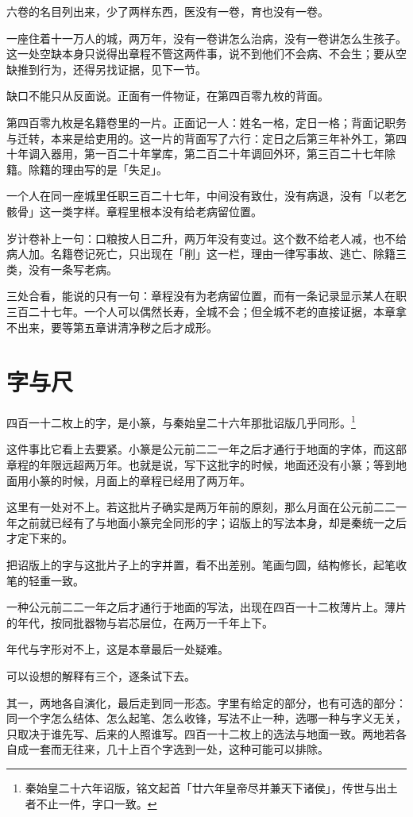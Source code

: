 六卷的名目列出来，少了两样东西，医没有一卷，育也没有一卷。

一座住着十一万人的城，两万年，没有一卷讲怎么治病，没有一卷讲怎么生孩子。这一处空缺本身只说得出章程不管这两件事，说不到他们不会病、不会生；要从空缺推到行为，还得另找证据，见下一节。

缺口不能只从反面说。正面有一件物证，在第四百零九枚的背面。

第四百零九枚是名籍卷里的一片。正面记一人：姓名一格，定日一格；背面记职务与迁转，本来是给吏用的。这一片的背面写了六行：定日之后第三年补外工，第四十年调入器用，第一百二十年掌库，第二百二十年调回外环，第三百二十七年除籍。除籍的理由写的是「失足」。

一个人在同一座城里任职三百二十七年，中间没有致仕，没有病退，没有「以老乞骸骨」这一类字样。章程里根本没有给老病留位置。

岁计卷补上一句：口粮按人日二升，两万年没有变过。这个数不给老人减，也不给病人加。名籍卷记死亡，只出现在「削」这一栏，理由一律写事故、逃亡、除籍三类，没有一条写老病。

三处合看，能说的只有一句：章程没有为老病留位置，而有一条记录显示某人在职三百二十七年。一个人可以偶然长寿，全城不会；但全城不老的直接证据，本章拿不出来，要等第五章讲清净秽之后才成形。

\section{字与尺}

四百一十二枚上的字，是小篆，与秦始皇二十六年那批诏版几乎同形。\footnote{秦始皇二十六年诏版，铭文起首「廿六年皇帝尽并兼天下诸侯」，传世与出土者不止一件，字口一致。}

这件事比它看上去要紧。小篆是公元前二二一年之后才通行于地面的字体，而这部章程的年限远超两万年。也就是说，写下这批字的时候，地面还没有小篆；等到地面用小篆的时候，月面上的章程已经用了两万年。

这里有一处对不上。若这批片子确实是两万年前的原刻，那么月面在公元前二二一年之前就已经有了与地面小篆完全同形的字；诏版上的写法本身，却是秦统一之后才定下来的。

把诏版上的字与这批片子上的字并置，看不出差别。笔画匀圆，结构修长，起笔收笔的轻重一致。

一种公元前二二一年之后才通行于地面的写法，出现在四百一十二枚薄片上。薄片的年代，按同批器物与岩芯层位，在两万一千年上下。

年代与字形对不上，这是本章最后一处疑难。

可以设想的解释有三个，逐条试下去。

其一，两地各自演化，最后走到同一形态。字里有给定的部分，也有可选的部分：同一个字怎么结体、怎么起笔、怎么收锋，写法不止一种，选哪一种与字义无关，只取决于谁先写、后来的人照谁写。四百一十二枚上的选法与地面一致。两地若各自成一套而无往来，几十上百个字选到一处，这种可能可以排除。

